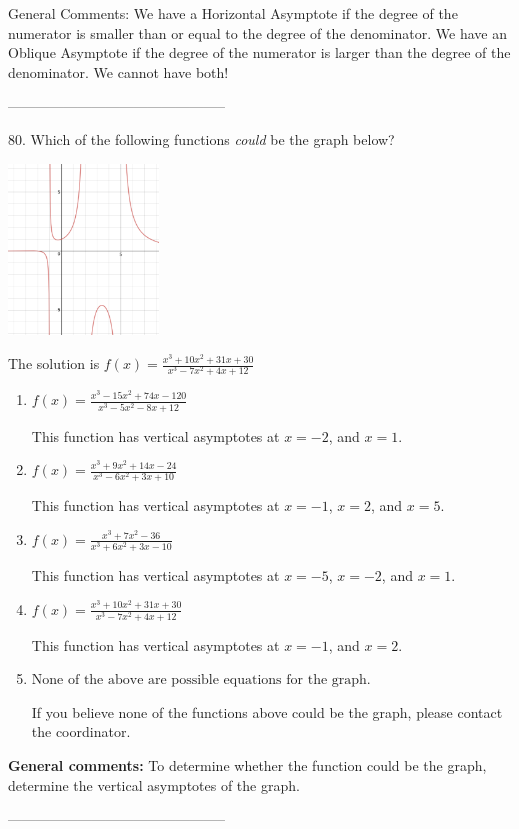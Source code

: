 \documentclass{extbook}[14pt]
\begin{document}
General Comments: We have a Horizontal Asymptote if the degree of the numerator is smaller than or equal to the degree of the denominator. We have an Oblique Asymptote if the degree of the numerator is larger than the degree of the denominator. We cannot have both!

-----------------------------------------------

80. Which of the following functions \textit{could} be the graph below?
\begin{center} \includegraphics[width=0.3\textwidth]{../Figures/identifyGraphOfRationalFunctionA.png} \end{center} 

The solution is $ f(x) = \frac{x^{3} +10 x^{2} +31 x + 30}{x^{3} -7 x^{2} +4 x + 12} $ 

\begin{enumerate}[label=\Alph*.] 
\item $ f(x) = \frac{x^{3} -15 x^{2} +74 x -120}{x^{3} -5 x^{2} -8 x + 12} $ 

 This function has vertical asymptotes at $x=-2$, and $x=1$. 
\item $ f(x) = \frac{x^{3} +9 x^{2} +14 x -24}{x^{3} -6 x^{2} +3 x + 10} $ 

 This function has vertical asymptotes at $x=-1$, $x=2$, and $x=5$. 
\item $ f(x) = \frac{x^{3} +7 x^{2} -36}{x^{3} +6 x^{2} +3 x -10} $ 

 This function has vertical asymptotes at $x=-5$, $x=-2$, and $x=1$. 
\item $ f(x) = \frac{x^{3} +10 x^{2} +31 x + 30}{x^{3} -7 x^{2} +4 x + 12} $ 

 This function has vertical asymptotes at $x=-1$, and $x=2$. 
\item $ \text{None of the above are possible equations for the graph.} $ 

 If you believe none of the functions above could be the graph, please contact the coordinator. 
\end{enumerate} 
 
\textbf{General comments:} To determine whether the function could be the graph, determine the vertical asymptotes of the graph.

-----------------------------------------------
\end{document}
